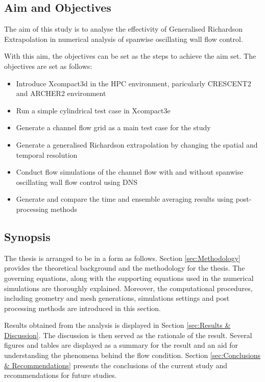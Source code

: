 \subsection{Aim and Objectives}
The aim of this study is to analyse the effectivity of Generalised Richardson Extrapolation in numerical analysis of spanwise oscillating wall flow control.

With this aim, the objectives can be set as the steps to achieve the aim set. The objectives are set as follows:
\begin{itemize}[noitemsep]
	\item Introduce Xcompact3d in the HPC environment, paricularly CRESCENT2 and ARCHER2 environment
	\item Run a simple cylindrical test case in Xcompact3e
    \item Generate a channel flow grid as a main test case for the study
    \item Generate a generalised Richardson extrapolation by changing the spatial and temporal resolution
    \item Conduct flow simulations of the channel flow with and without spanwise oscillating wall flow control using DNS
    \item Generate and compare the time and ensemble averaging results using post-processing methods

\end{itemize}



\subsection{Synopsis}
\label{sec:Sinopsis}
The thesis is arranged to be in a form as follows. Section \ref{sec:Methodology} provides the theoretical background and the methodology for the thesis. The governing equations, along with the supporting equations used in the numerical simulations are thoroughly explained. Moreover, the computational procedures, including geometry and mesh generations, simulations settings and post processing methods are introduced in this section.

Results obtained from the analysis is displayed in Section \ref{sec:Results & Discussion}. The discussion is then served as the rationale of the result. Several figures and tables are displayed as a summary for the result and an aid for understanding the phenomena behind the flow condition. Section \ref{sec:Conclusions & Recommendations} presents the conclusions of the current study and recommendations for future studies.

